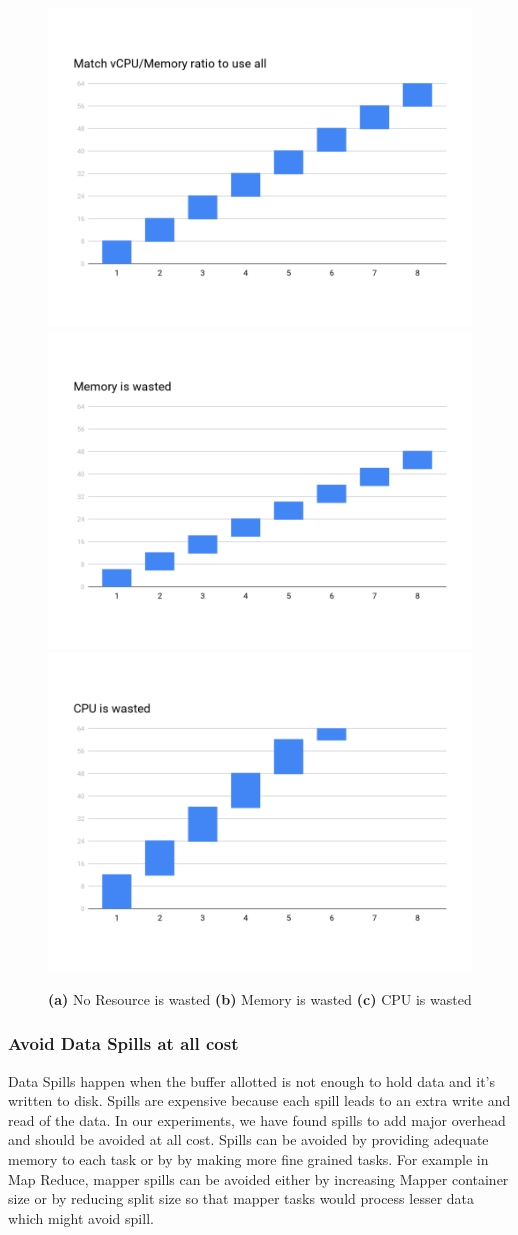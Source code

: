 \begin{figure}[h]
	\includegraphics[width=0.33\linewidth]{container_shape1.png} 
	\includegraphics[width=0.33\linewidth]{container_shape2.png}
	\includegraphics[width=0.33\linewidth]{container_shape3.png}
	\caption{\textbf{(a)} No Resource is wasted \textbf{(b)} Memory is wasted \textbf{(c)} CPU is wasted}
	\label{fig:container_shape}
\end{figure}

\noindent\subsubsection*{\bf Avoid Data Spills at all cost}
Data Spills happen when the buffer allotted is not enough to hold data and it's written to disk. Spills are expensive because each spill leads to an extra write and read of the data. In our experiments, we have found spills to add major overhead and should be avoided at all cost. Spills can be avoided by providing adequate memory to each task or by by making more fine grained tasks.
For example in Map Reduce, mapper spills can be avoided either by increasing Mapper container size or by reducing split size so that mapper tasks would process lesser data which might avoid spill.

